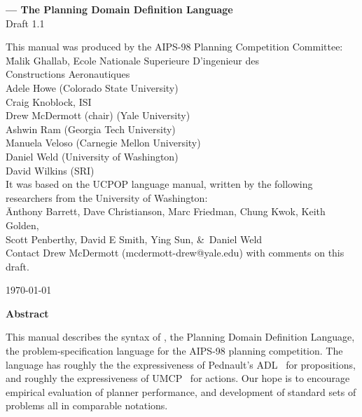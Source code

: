 \begin{center}
{\bf {\LARGE \lang{} --- The Planning Domain Definition Language}} \\
Draft 1.1

\vspace{0.5in}
\end{center}
\begin{tabbing}
This manual was produced by the AIPS-98 Planning Competition
Committee: 
\vspace{0.5cm} \\
\hspace{3cm}\=
    Malik Ghallab, Ecole Nationale Superieure D'ingenieur des \+\\
\hspace{3cm}		     Constructions Aeronautiques  \\
Adele Howe (Colorado State University) \\
Craig Knoblock, ISI \\
Drew McDermott (chair) (Yale University) \\
Ashwin Ram (Georgia Tech University) \\
Manuela Veloso (Carnegie Mellon University) \\
Daniel Weld (University of Washington) \\
David Wilkins (SRI) \-\\
\vspace{2cm}
It was based on the UCPOP language manual, written by the following \\
researchers from the University of Washington: \\
\vspace{0.5cm}
\hspace{3cm}\=
Anthony Barrett, Dave Christianson, Marc Friedman, Chung Kwok, Keith Golden, \+\\

Scott Penberthy, David E Smith, Ying Sun, \&\ Daniel Weld \-\\
\vspace{2cm}
Contact Drew McDermott (mcdermott-drew@yale.edu) with comments on this draft.
\end{tabbing}


\today \\
\vspace{.4in}




\vspace{1in}
{\large\bf Abstract}

This manual describes the syntax of \lang, the Planning Domain Definition Language,
the problem-specification language for the AIPS-98 planning competition.
The language has roughly the the expressiveness of Pednault's
ADL~\cite{pednault-kr89} for propositions, and roughly the expressiveness of
UMCP~\cite{erol-aips-94} for actions.  Our hope is to encourage empirical
evaluation of planner performance, and development of standard sets of problems 
all in comparable notations.

